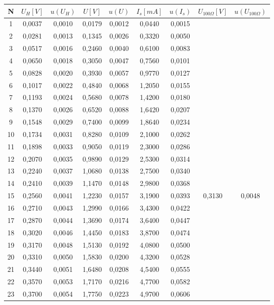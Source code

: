 \documentclass[10pt,a4paper]{article}
\begin{document}
\hfill
\begin{tabular}{c|c|c|c|c|c|c|c|c}
N	&	$U_H [V]$	&	$u(U_H)$	&	$U[V]$	&	$u(U)$	&	 $I_s[mA]$	&	$u(I_s)$	&	 $U_{100\Omega}[V]$	&	$u(U_{100\Omega})$	 \\\hline
1	&	0,0037	&	0,0010	&	0,0179	&	0,0012	&	0,0440	&	0,0015	&		&		 \\
2	&	0,0281	&	0,0013	&	0,1345	&	0,0026	&	0,3320	&	0,0050	&		&		 \\
3	&	0,0517	&	0,0016	&	0,2460	&	0,0040	&	0,6100	&	0,0083	&		&		 \\
4	&	0,0650	&	0,0018	&	0,3050	&	0,0047	&	0,7560	&	0,0101	&		&		 \\
5	&	0,0828	&	0,0020	&	0,3930	&	0,0057	&	0,9770	&	0,0127	&		&		 \\
6	&	0,1017	&	0,0022	&	0,4840	&	0,0068	&	1,2050	&	0,0155	&		&		 \\
7	&	0,1193	&	0,0024	&	0,5680	&	0,0078	&	1,4200	&	0,0180	&		&		 \\
8	&	0,1370	&	0,0026	&	0,6520	&	0,0088	&	1,6420	&	0,0207	&		&		 \\
9	&	0,1548	&	0,0029	&	0,7400	&	0,0099	&	1,8640	&	0,0234	&		&		 \\
10	&	0,1734	&	0,0031	&	0,8280	&	0,0109	&	2,1000	&	0,0262	&		&		 \\
11	&	0,1898	&	0,0033	&	0,9050	&	0,0119	&	2,3000	&	0,0286	&		&		 \\
12	&	0,2070	&	0,0035	&	0,9890	&	0,0129	&	2,5300	&	0,0314	&		&		 \\
13	&	0,2240	&	0,0037	&	1,0680	&	0,0138	&	2,7500	&	0,0340	&		&		 \\
14	&	0,2410	&	0,0039	&	1,1470	&	0,0148	&	2,9800	&	0,0368	&		&		 \\
15	&	0,2560	&	0,0041	&	1,2230	&	0,0157	&	3,1900	&	0,0393	&	0,3130	&	0,0048	\\
16	&	0,2710	&	0,0043	&	1,2990	&	0,0166	&	3,4300	&	0,0422	&		&		 \\
17	&	0,2870	&	0,0044	&	1,3690	&	0,0174	&	3,6400	&	0,0447	&		&		 \\
18	&	0,3020	&	0,0046	&	1,4450	&	0,0183	&	3,8700	&	0,0474	&		&		 \\
19	&	0,3170	&	0,0048	&	1,5130	&	0,0192	&	4,0800	&	0,0500	&		&		 \\
20	&	0,3310	&	0,0050	&	1,5830	&	0,0200	&	4,3200	&	0,0528	&		&		 \\
21	&	0,3440	&	0,0051	&	1,6480	&	0,0208	&	4,5400	&	0,0555	&		&		 \\
22	&	0,3570	&	0,0053	&	1,7170	&	0,0216	&	4,7700	&	0,0582	&		&		 \\
23	&	0,3700	&	0,0054	&	1,7750	&	0,0223	&	4,9700	&	0,0606	&		&		 \\

\end{tabular}
\end{document}
